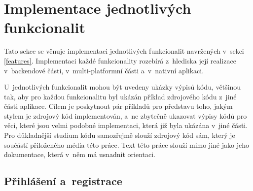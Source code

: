 \section{Implementace jednotlivých funkcionalit}

Tato sekce se věnuje implementaci jednotlivých funkcionalit navržených v~sekci \ref{features}. Implementaci každé funkcionality rozebírá z~hlediska její realizace v~backendové části, v~multi-platformní části a~v~nativní aplikaci. 

U~jednotlivých funkcionalit mohou být uvedeny ukázky výpisů kódu, většinou tak, aby pro každou funkcionalitu byl ukázán příklad zdrojového kódu z~jiné části aplikace. Cílem je poskytnout pár příkladů pro představu toho, jakým stylem je zdrojový kód implementován, a~ne zbytečně ukazovat výpisy kódů pro věci, které jsou velmi podobné implementaci, která již byla ukázána v~jiné části. Pro důkladnější studium kódu samozřejmě slouží zdrojový kód sám, který je součástí přiloženého média této práce. Text této práce slouží mimo jiné jako jeho dokumentace, která v~něm má usnadnit orientaci.

\subsection{Přihlášení a~registrace}\label{onboarding-impl}


